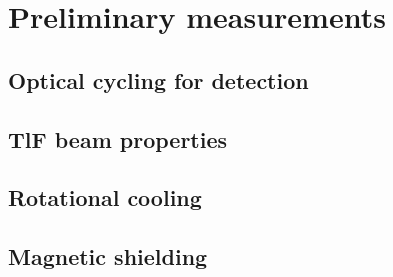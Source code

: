 \section{Preliminary measurements}


\subsection{Optical cycling for detection}

\subsection{TlF beam properties}

\subsection{Rotational cooling}

\subsection{Magnetic shielding}
